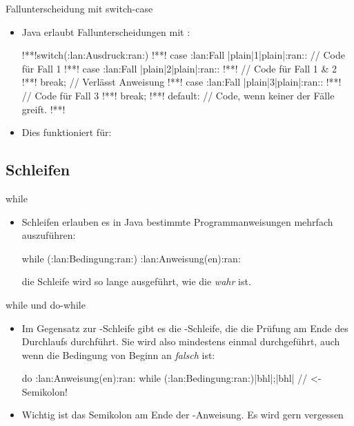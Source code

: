 \begin{frame}[fragile]{Fallunterscheidung mit switch-case}
    \begin{itemize}[<+(1)->]
        \item Java erlaubt Fallunterscheidungen mit :\pause{}
\begin{plainjava}
!**!switch(:lan:Ausdruck:ran:){
!**!    case :lan:Fall |plain|1|plain|:ran:: // Code für Fall 1
!**!    case :lan:Fall |plain|2|plain|:ran::
!**!        // Code für Fall 1 & 2
!**!        break; // Verlässt Anweisung
!**!    case :lan:Fall |plain|3|plain|:ran::
!**!        // Code für Fall 3
!**!        break;
!**!    default: // Code, wenn keiner der Fälle greift.
!**!}
\end{plainjava}
    \item<10-> Dies funktioniert für: 
    \end{itemize}
\end{frame}

\subsection{Schleifen}

\begin{frame}[fragile]{while}
    \begin{itemize}[<+(1)->]
        \item Schleifen erlauben es in Java bestimmte Programmanweisungen mehrfach auszuführen:\pause{}
        \begin{plainjava}
while (:lan:Bedingung:ran:) {
    :lan:Anweisung(en):ran:
}
        \end{plainjava}
        \pause{} die Schleife wird so lange ausgeführt, wie die  \emph{wahr} ist.
    \end{itemize}
\end{frame}

\begin{frame}[fragile]{while und do-while}
    \begin{itemize}[<+(1)->]
        \item Im Gegensatz zur -Schleife gibt es die -Schleife,\pause{} die die Prüfung am Ende des Durchlaufs durchführt.\pause{} Sie wird also mindestens einmal durchgeführt,\pause{} auch wenn die Bedingung von Beginn an \emph{falsch} ist:
        \begin{plainjava}
do {
    :lan:Anweisung(en):ran:
} while (:lan:Bedingung:ran:)|bhl|;|bhl| // <- Semikolon!
        \end{plainjava}
        \item Wichtig ist das Semikolon am Ende der -Anweisung. Es wird gern vergessen
    \end{itemize}
\end{frame}

